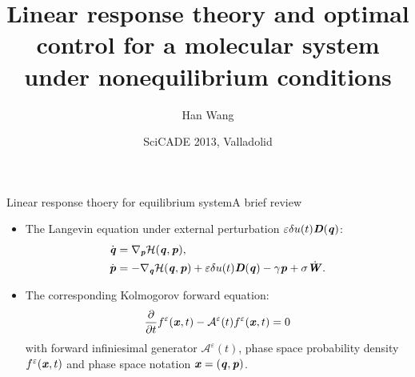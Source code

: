 \documentclass[fleqn]{beamer}
\newcommand{\bluec}[1]{{\color{blue} #1}}
\newcommand{\vect}[1]{\textbf{\textit{#1}}}
\newcommand{\fe}{u}
\newcommand{\mh}{\mathcal H}
\newcommand{\eps}{\varepsilon}
\newcommand{\fwg}{{\mathcal A}}
\begin{document}
\title[Response theory for nonequilibrium system]{
  Linear response theory and optimal control for a molecular system under nonequilibrium conditions
}
%
\author{Han Wang}
\date[Sept. 2013]{SciCADE 2013, Valladolid}

\frame{\titlepage}

\begin{frame}{Linear response thoery for equilibrium system}{A brief review}
  \begin{itemize}
  \item <1->
    The Langevin equation under external perturbation
    \bluec{$\eps \delta\fe(t) \vect D(\vect q)$}:
    \bluec{
      \begin{align*}
        \dot{\vect q} & = \nabla_{\vect p}\mh(\vect q,\vect p), \\
        \dot{\vect p} & =- \nabla_{\vect q}\mh(\vect q,\vect p)
        + \eps \delta\fe(t) \vect D(\vect q) 
        - \gamma\vect p
        + \sigma\dot{\vect W}.
      \end{align*}
    }
  \item <2->
    The corresponding Kolmogorov forward equation:
    \bluec{
      \begin{align*}
        \frac{\partial}{\partial t} f^\eps(\vect x, t) - \fwg^\eps(t) f^\eps(\vect x, t) = 0
      \end{align*}
    }
    with forward infiniesimal generator \bluec{$\fwg^\eps (t)$}, phase space
    probability density \bluec{$f^\eps(\vect x, t)$} and phase space notation
    \bluec{$\vect x  = (\vect q, \vect p)$}.
  \end{itemize}
\end{frame}
\end{document}
